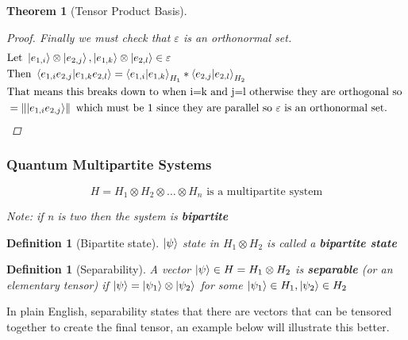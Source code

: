 \documentclass[12pt]{article}
\theoremstyle{plain}
\newtheorem{theorem}[lemma]{Theorem}
\theoremstyle{nonumberplain}
\theoremstyle{plain}
\newtheorem{definition}[lemma]{Definition}
\theoremstyle{nonumberplain}
\newtheorem{proof}{Proof.}
\newcommand\1{{\bf 1}}
\newcommand{\<}{\left\langle}
\renewcommand{\>}{\right\rangle}
\newcommand{\norm}[1]{\left\lVert#1\right\rVert} %
\begin{document}
\begin{theorem} [Tensor Product Basis]
\begin{proof}
Finally we must check that $\varepsilon$ is an orthonormal set.
\begin{equation}
\begin{split}
&\text{Let }\ket{e_{1,i}} \otimes \ket{e_{2,j}}, \ket{e_{1,k}} \otimes \ket{e_{2,l}} \in \varepsilon\\
&\text{Then }\braket{e_{1,i}e_{2,j}|e_{1,k}e_{2,l}} = \braket{e_{1,i}|e_{1,k}}_{H_1} * \braket{e_{2,j}|e_{2,l}}_{H_2}\\
&\text{That means this breaks down to when i=k and j=l otherwise they are orthogonal so }\\
&= \norm{\ket{e_{1,i}e_{2,j}}} \text{ which must be 1 since they are parallel so $\varepsilon$ is an orthonormal set.}
\end{split}
\end{equation}
\end{proof}
\end{theorem}

\pagebreak
\subsubsection{Quantum Multipartite Systems}
\begin{equation}
H = H_1 \otimes H_2 \otimes \dots \otimes H_n \text{ is a multipartite system}
\end{equation}
\begin{center}
\textit{Note: if n is two then the system is \textbf{bipartite}}
\end{center}

\begin{definition} [Bipartite state]
$\ket{\psi}$ state in $H_1 \otimes H_2$ is called a \textbf{bipartite state}
\end{definition}

\begin{definition} [Separability]
A vector $\ket{\psi} \in H = H_1 \otimes H_2$ is \textbf{separable} (or an elementary tensor) if $\ket{\psi} = \ket{\psi_1} \otimes \ket{\psi_2}$ for some $\ket{\psi_1} \in H_1, \ket{\psi_2} \in H_2$
\end{definition}
In plain English, separability states that there are vectors that can be tensored together to create the final tensor, an example below will illustrate this better.
\end{document}
